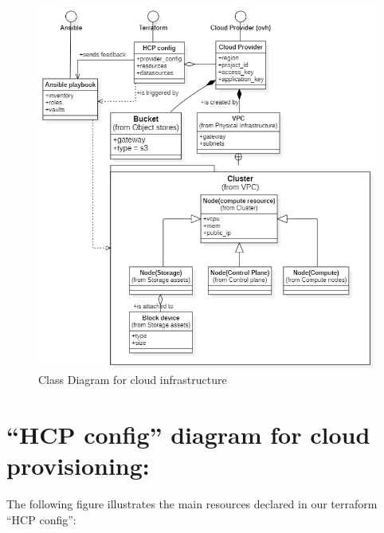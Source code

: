 \begin{figure}[H]\centering
\includegraphics[width=1.0\textwidth,angle=00]{assets/f13.png}
\caption{Class Diagram for cloud infrastructure}
\label{fig:fig13}
\end{figure}

\section{“HCP config” diagram for cloud provisioning: }
The following figure illustrates the main resources declared in our terraform “HCP config”: 

